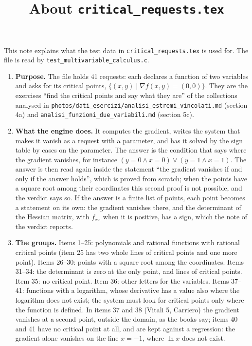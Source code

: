 \documentclass[11pt,a4paper]{article}
\title{About \texttt{critical\_requests.tex}}
\author{}
\date{}
\begin{document}
\maketitle
This note explains what the test data in \texttt{critical\_requests.tex} is used for. The file is read by \texttt{test\_multivariable\_calculus.c}.

\begin{enumerate}
\item \textbf{Purpose.} The file holds 41 requests: each declares a function of two variables and asks for its critical points, $\{(x, y) \mid \nabla f(x, y) = (0, 0)\}$. They are the exercises ``find the critical points and say what they are'' of the collections analysed in \texttt{photos/dati\_esercizi/analisi\_estremi\_vincolati.md} (section 4a) and \texttt{analisi\_funzioni\_due\_variabili.md} (section 5c).

\item \textbf{What the engine does.} It computes the gradient, writes the system that makes it vanish as a request with a parameter, and has it solved by the sign table by cases on the parameter. The answer is the condition that says where the gradient vanishes, for instance $(y = 0 \land x = 0) \lor (y = 1 \land x = 1)$. The answer is then read again inside the statement ``the gradient vanishes if and only if the answer holds'', which is proved from scratch; when the points have a square root among their coordinates this second proof is not possible, and the verdict says so. If the answer is a finite list of points, each point becomes a statement on its own: the gradient vanishes there, and the determinant of the Hessian matrix, with $f_{xx}$ when it is positive, has a sign, which the note of the verdict reports.

\item \textbf{The groups.} Items 1--25: polynomials and rational functions with rational critical points (item 25 has two whole lines of critical points and one more point). Items 26--30: points with a square root among the coordinates. Items 31--34: the determinant is zero at the only point, and lines of critical points. Item 35: no critical point. Item 36: other letters for the variables. Items 37--41: functions with a logarithm, whose derivative has a value also where the logarithm does not exist; the system must look for critical points only where the function is defined. In items 37 and 38 (Vitali 5, Carriero) the gradient vanishes at a second point, outside the domain, as the books say; items 40 and 41 have no critical point at all, and are kept against a regression: the gradient alone vanishes on the line $x = -1$, where $\ln x$ does not exist.


\end{enumerate}
\end{document}
